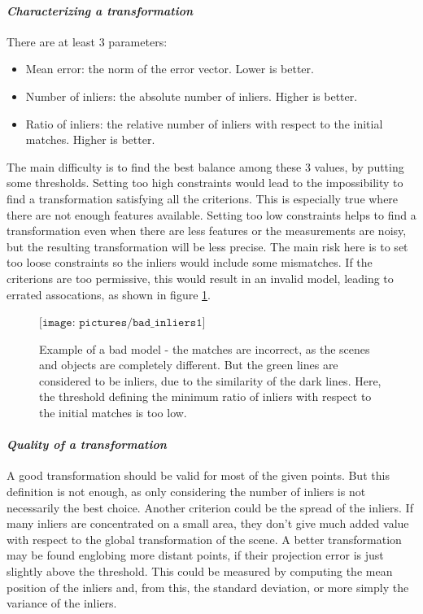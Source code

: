 \clearpage
\paragraph{\emph{Characterizing a transformation}}

There are at least 3 parameters:
\begin{itemize}
\item Mean error: the norm of the error vector. Lower is better.
\item Number of inliers: the absolute number of inliers. Higher is better.
\item Ratio of inliers: the relative number of inliers with respect to the initial matches. Higher is better.
\end{itemize}

The main difficulty is to find the best balance among these 3 values, by putting some thresholds. Setting too high constraints would lead to the impossibility to find a transformation satisfying all the criterions. This is especially true where there are not enough features available. Setting too low constraints helps to find a transformation even when there are less features or the measurements are noisy, but the resulting transformation will be less precise. The main risk here is to set too loose constraints so the inliers would include some mismatches. If the criterions are too permissive, this would result in an invalid model, leading to errated assocations, as shown in figure \ref{fig:bad_inliers}. 

\begin{figure}[H]
\centering$
\texttt{[image: pictures/bad\_inliers1]}$
\caption{Example of a bad model - the matches are incorrect, as the scenes and objects are completely different. But the green lines are considered to be inliers, due to the similarity of the dark lines. Here, the threshold defining the minimum ratio of inliers with respect to the initial matches is too low.}
\label{fig:bad_inliers}
\end{figure}

\paragraph{\emph{Quality of a transformation}}

A good transformation should be valid for most of the given points. But this definition is not enough, as only considering the number of inliers is not necessarily the best choice. Another criterion could be the spread of the inliers. If many inliers are concentrated on a small area, they don't give much added value with respect to the global transformation of the scene. A better transformation may be found englobing more distant points, if their projection error is just slightly above the threshold. This could be measured by computing the mean position of the inliers and, from this, the standard deviation, or more simply the variance of the inliers.

